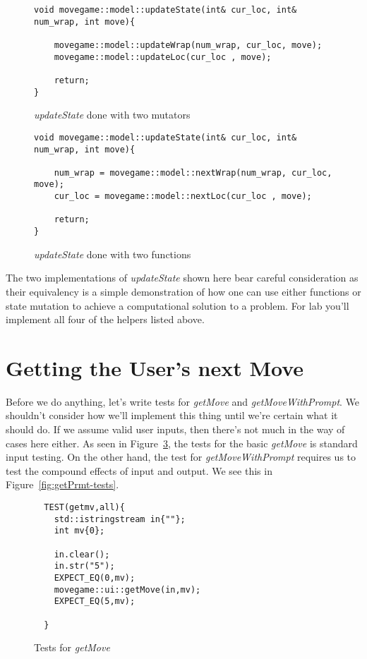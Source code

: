\documentclass[nobib]{tufte-handout}
\begin{document}
\begin{figure}[!htbp]
\begin{lstlisting}
void movegame::model::updateState(int& cur_loc, int& num_wrap, int move){

	movegame::model::updateWrap(num_wrap, cur_loc, move);
	movegame::model::updateLoc(cur_loc , move);

	return;
}
\end{lstlisting}
\caption{\textit{updateState} done with two mutators}
\label{fig:update-mutate}
\end{figure}


\begin{figure}[!htbp]
\begin{lstlisting}
void movegame::model::updateState(int& cur_loc, int& num_wrap, int move){

	num_wrap = movegame::model::nextWrap(num_wrap, cur_loc, move);
	cur_loc = movegame::model::nextLoc(cur_loc , move);

	return;
}
\end{lstlisting}
\caption{\textit{updateState} done with two functions}
\label{fig:update-func}
\end{figure}

The two implementations of \textit{updateState} shown here bear careful consideration as their equivalency is a simple demonstration of how one can use either functions or state mutation to achieve a computational solution to a problem. For lab you'll implement all four of the helpers listed above.

\section{Getting the User's next Move}

Before we do anything, let's write tests for \textit{getMove} and \textit{getMoveWithPrompt}. We shouldn't consider how we'll implement this thing until we're certain what it should do. If we assume valid user inputs, then there's not much in the way of cases here either. As seen in Figure~\ref{fig:get-tests}, the tests for the basic \textit{getMove} is standard input testing.  On the other hand, the test for \textit{getMoveWithPrompt} requires us to test the compound effects of input and output. We see this in Figure~\ref{fig:getPrmt-tests}.

\begin{figure}[!htbp]
\begin{lstlisting}
  TEST(getmv,all){
    std::istringstream in{""};
    int mv{0};

    in.clear();
    in.str("5");
    EXPECT_EQ(0,mv);
    movegame::ui::getMove(in,mv);
    EXPECT_EQ(5,mv);

  }
\end{lstlisting}
\caption{Tests for \textit{getMove}}
\label{fig:get-tests}
\end{figure}
\end{document}
